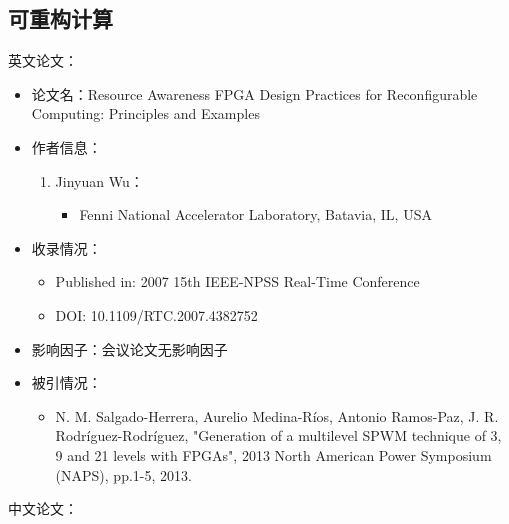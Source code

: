 \subsection{可重构计算}

英文论文：
\begin{itemize}
    \item 论文名：Resource Awareness FPGA Design Practices for Reconfigurable Computing: Principles and Examples

    \item 作者信息：
        \begin{enumerate}
            \item Jinyuan Wu：
                \begin{itemize}
                    \item Fenni National Accelerator Laboratory, Batavia, IL, USA
                \end{itemize}
        \end{enumerate}

    \item 收录情况：
        \begin{itemize}
            \item Published in: 2007 15th IEEE-NPSS Real-Time Conference
            \item DOI: 10.1109/RTC.2007.4382752
        \end{itemize}

    \item 影响因子：会议论文无影响因子

    \item 被引情况：
        \begin{itemize}
            \item N. M. Salgado-Herrera, Aurelio Medina-Ríos, Antonio Ramos-Paz, J. R. Rodríguez-Rodríguez, "Generation of a multilevel SPWM technique of 3, 9 and 21 levels with FPGAs", 2013 North American Power Symposium (NAPS), pp.1-5, 2013.
        \end{itemize}
\end{itemize}

中文论文：

